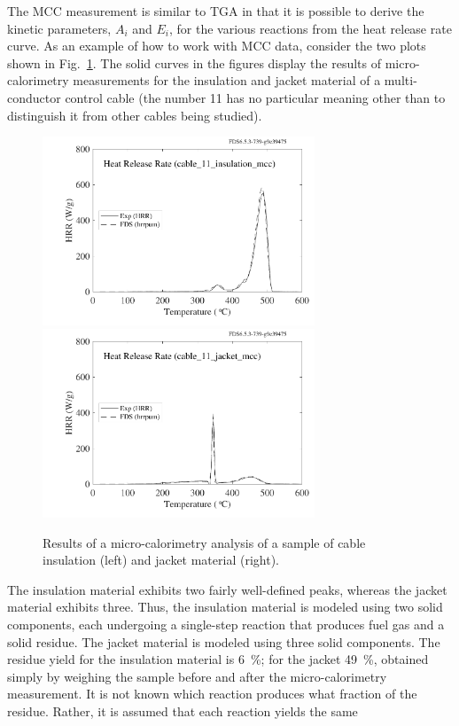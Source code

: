 \documentclass[11pt]{book}
\begin{document}
The MCC measurement is similar to TGA in that it is possible to derive the kinetic parameters, $A_i$ and $E_i$, for the various reactions from
the heat release rate curve. As an example of how to work with MCC data, consider the two plots shown in Fig.~\ref{mcc_plots}. The solid curves in the figures
display the results of micro-calorimetry measurements for the insulation and jacket material of a multi-conductor control
cable (the number 11 has no particular meaning other than to distinguish it from other cables being studied).
\begin{figure}[ht]
\includegraphics[width=3.2in]{SCRIPT_FIGURES/cable_11_insulation_mcc}
\includegraphics[width=3.2in]{SCRIPT_FIGURES/cable_11_jacket_mcc}
\caption{Results of a micro-calorimetry analysis of a sample of cable insulation (left) and jacket material (right).}
\label{mcc_plots}
\end{figure}
The insulation material exhibits two fairly well-defined peaks, whereas the jacket material exhibits three. Thus, the insulation
material is modeled using two solid components, each undergoing a single-step reaction that produces fuel gas and a solid residue. The jacket
material is modeled using three solid components. The residue yield for the insulation material is
6~\%; for the jacket 49~\%, obtained simply by weighing the sample before and after the micro-calorimetry measurement. It is
not known which reaction produces what fraction of the residue. Rather, it is assumed that each reaction yields the same
\end{document}
